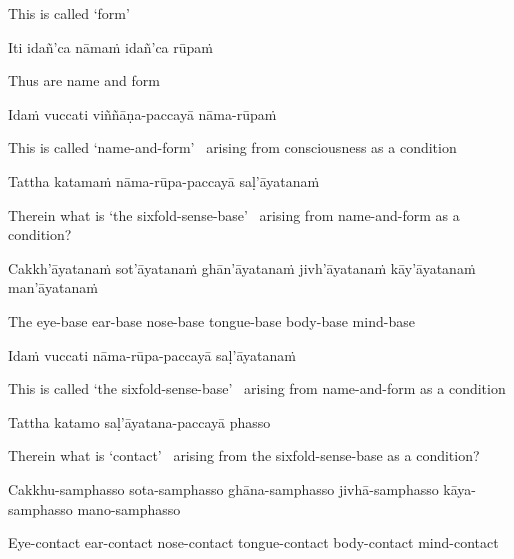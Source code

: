 \begin{english}
  This is called `form'
\end{english}

Iti idañ'ca nāmaṁ idañ'ca rūpaṁ

\begin{english}
  Thus are name and form
\end{english}

Idaṁ vuccati viññāṇa-paccayā nāma-rūpaṁ

\begin{english-hang}
  This is called `name-and-form' \breathmark\ arising from consciousness as a condition
\end{english-hang}

Tattha katamaṁ nāma-rūpa-paccayā saḷ'āyatanaṁ

\begin{english-hang}
  Therein what is `the sixfold-sense-base' \breathmark\ arising from name-and-form as a condition?
\end{english-hang}


\begin{pali-hang}
  Cakkh'āyatanaṁ sot'āyatanaṁ ghān'āyatanaṁ jivh'āyatanaṁ kāy'āyatanaṁ man'āyatanaṁ
\end{pali-hang}

\begin{english-hang}
  The eye-base ear-base nose-base tongue-base body-base mind-base
\end{english-hang}

Idaṁ vuccati nāma-rūpa-paccayā saḷ'āyatanaṁ

\begin{english-hang}
  This is called `the sixfold-sense-base' \breathmark\ arising from name-and-form as a condition
\end{english-hang}

Tattha katamo saḷ'āyatana-paccayā phasso

\begin{english-hang}
  Therein what is `contact' \breathmark\ arising from the sixfold-sense-base as a condition?
\end{english-hang}

\begin{pali-hang}
  Cakkhu-samphasso sota-samphasso ghāna-samphasso jivhā-samphasso kāya-samphasso mano-samphasso
\end{pali-hang}

\begin{english-hang}
  Eye-contact ear-contact nose-contact tongue-contact body-contact mind-contact
\end{english-hang}

